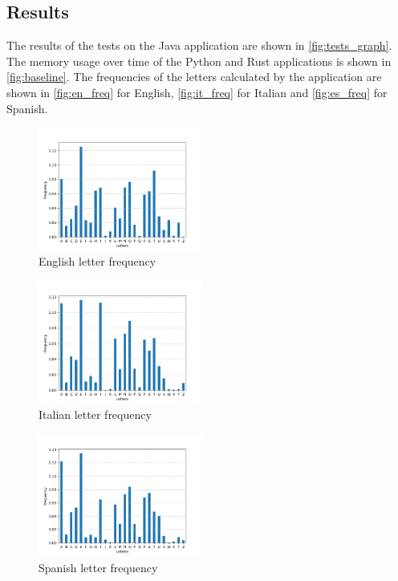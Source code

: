 \documentclass{article}
\begin{document}
\begin{multicols}{2}
\section{Results}
    The results of the tests on the Java application are shown in \autoref{fig:tests_graph}.
    The memory usage over time of the Python and Rust applications is shown in \autoref{fig:baseline}.
    The frequencies of the letters calculated by the application are shown in 
    \autoref{fig:en_freq} for English, \autoref{fig:it_freq} for Italian and 
    \autoref{fig:es_freq} for Spanish.
    \begin{figure}[H]
        \centering
        \capstart
        \includegraphics[width=0.48\textwidth]{figures/en.png}
        \caption{English letter frequency}
        \label{fig:en_freq}
    \end{figure}
    \begin{figure}[H]
        \centering
        \capstart
        \includegraphics[width=0.48\textwidth]{figures/it.png}
        \caption{Italian letter frequency}
        \label{fig:it_freq}
    \end{figure}
    \begin{figure}[H]
        \centering
        \capstart
        \includegraphics[width=0.48\textwidth]{figures/es.png}
        \caption{Spanish letter frequency}
        \label{fig:es_freq}
    \end{figure}

\end{multicols}
\end{document}
